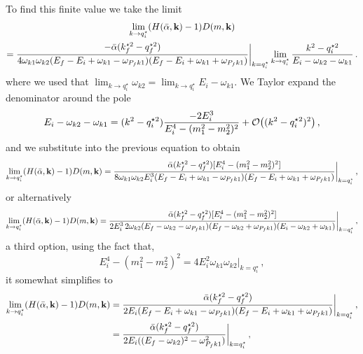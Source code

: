 \documentclass[aps,prd,onecolumn,groupedaddress]{revtex4-2}
\begin{document}
To find this finite value we take the limit
\begin{multline}
    \lim_{k\to q^\star_i}(H(\bar{\alpha}, \textbf k) - 1)D(m, \mathbf k) 
    \\ =
    \frac{-\bar \alpha (k^{\star 2}_f - q^{\star 2}_f)}{4\omega_{k1}\omega_{k2}  (E_f-E_i+\omega_{k1} - \omega_{P_fk1})
  (E_f-E_i+\omega_{k1} + \omega_{P_fk1})}\bigg  |_{k=q_i^\star} 
  \lim_{k\to q^\star_i}
  \frac{k^{2} - q^{\star 2}_i}{E_i-\omega_{k2} - \omega_{k1}}\,.
\end{multline}
where we used that $\lim_{k\to q^\star_i}\omega_{k2}=\lim_{k\to q^\star_i}E_i-\omega_{k1}$.
We Taylor expand the denominator around the pole
\begin{equation}
    E_i-\omega_{k2} - \omega_{k1} = (k^2-q^{\star2}_i)\frac{-2 E_i^3}{E_i^4-(m_1^2-m_2^2)^2} + \mathcal{O}\qty((k^2-q^{\star2}_i)^2)\,,
\end{equation}
and we substitute into the previous equation to obtain
\begin{equation}
    \lim_{k\to q^\star_i}(H(\bar{\alpha}, \textbf k) - 1)D(m, \mathbf k) = 
    \frac{\bar \alpha (k^{\star 2}_f - q^{\star 2}_f)[E_i^4-(m_1^2-m_2^2)^2]}{8\omega_{k1}\omega_{k2} E_i^3 (E_f-E_i+\omega_{k1} - \omega_{P_fk1})
  (E_f-E_i+\omega_{k1} + \omega_{P_fk1})}\bigg  |_{k=q_i^\star} \,,
\end{equation}
or alternatively
\begin{equation}
    \lim_{k\to q^\star_i}(H(\bar{\alpha}, \textbf k) - 1)D(m, \mathbf k) = 
    \frac{\bar \alpha (k^{\star 2}_f - q^{\star 2}_f)[E_i^4-(m_1^2-m_2^2)^2]}{2E_i^3\,2\omega_{k2}  (E_f-\omega_{k2} - \omega_{P_fk1})
  (E_f-\omega_{k2} + \omega_{P_fk1}) 
  (E_i-\omega_{k2} + \omega_{k1}) }\bigg  |_{k=q_i^\star} \,,
\end{equation}
a third option, using the fact that,
\begin{equation}
    E_i^4-(m_1^2-m_2^2)^2 = 4E_i^2\omega_{k1}\omega_{k2}\bigg  |_{k=q_i^\star}\,,
\end{equation}
it somewhat simplifies to
\begin{align}
    \lim_{k\to q^\star_i}(H(\bar{\alpha}, \textbf k) - 1)D(m, \mathbf k) &= 
    \frac{\bar \alpha (k^{\star 2}_f - q^{\star 2}_f)}{2E_i (E_f-E_i+\omega_{k1} - \omega_{P_fk1})
  (E_f-E_i+\omega_{k1} + \omega_{P_fk1})}\bigg  |_{k=q_i^\star} \,,\\
  &= \frac{\bar \alpha (k^{\star 2}_f - q^{\star 2}_f)}{2E_i ((E_f-\omega_{k2})^2- \omega_{P_fk1}^2)}\bigg  |_{k=q_i^\star} \,,
\end{align}
\end{document}
